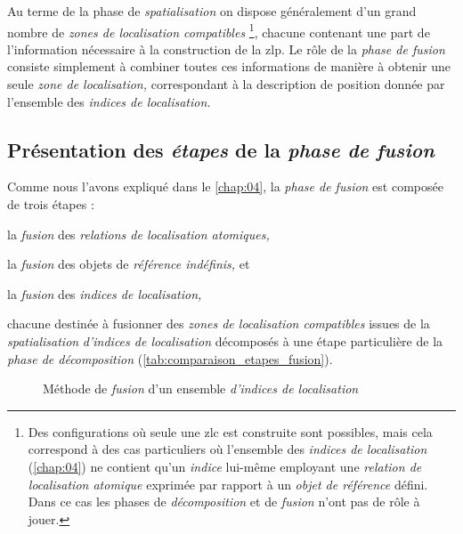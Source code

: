 Au terme de la phase de \emph{spatialisation} on dispose généralement
d'un grand nombre de \emph{zones de localisation compatibles}
\footnote{Des configurations où seule une \ac{zlc} est construite sont
  possibles, mais cela correspond à des cas particuliers où l'ensemble
  des \emph{indices de localisation} (\autoref{chap:04}) ne contient
  qu'un \emph{indice} lui-même employant une \emph{relation de
    localisation atomique} exprimée par rapport à un \emph{objet de
    référence} défini. Dans ce cas les phases de \emph{décomposition}
  et de \emph{fusion} n'ont pas de rôle à jouer.}, chacune contenant
une part de l'information nécessaire à la construction de la
\ac{zlp}. Le rôle de la \emph{phase de fusion} consiste simplement à
combiner toutes ces informations de manière à obtenir une seule
\emph{zone de localisation,} correspondant à la description de
position donnée par l'ensemble des \emph{indices de localisation.}

\subsection{Présentation des \emph{étapes} de la \emph{phase de
    fusion}}

Comme nous l'avons expliqué dans le \autoref{chap:04}, la \emph{phase
  de fusion} est composée de trois étapes :
%
\begin{enumerate*}[label=(\arabic*)]
\item la \emph{fusion} des \emph{relations de localisation atomiques,}
\item la \emph{fusion} des objets de \emph{référence indéfinis,} et
\item la \emph{fusion} des \emph{indices de localisation,}
\end{enumerate*}
%
chacune destinée à fusionner des \emph{zones de localisation
  compatibles} issues de la \emph{spatialisation} \emph{d'indices de
  localisation} décomposés à une étape particulière de la \emph{phase
  de décomposition} (\autoref{tab:comparaison_etapes_fusion}).

\begin{figure}
  \centering
  
  \caption{Méthode de \emph{fusion} d'un ensemble \emph{d'indices de localisation}}
  \label{fig:methodo_fusion}
\end{figure}

